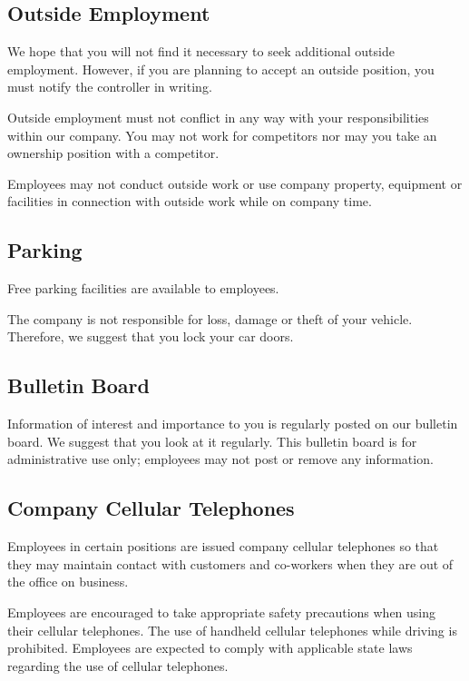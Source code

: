 \subsection{Outside Employment}

We hope that you will not find it necessary to seek additional outside employment. However, if you are planning to accept an outside position, you must notify the controller in writing.

Outside employment must not conflict in any way with your responsibilities within our company. You may not work for competitors nor may you take an ownership position with a competitor.

Employees may not conduct outside work or use company property, equipment or facilities in connection with outside work while on company time.

\subsection{Parking}

Free parking facilities are available to employees.

The company is not responsible for loss, damage or theft of your vehicle. Therefore, we suggest that you lock your car doors.

\subsection{Bulletin Board}

Information of interest and importance to you is regularly posted on our bulletin board. We suggest that you look at it regularly. This bulletin board is for administrative use only; employees may not post or remove any information.

\subsection{Company Cellular Telephones}

Employees in certain positions are issued company cellular telephones so that they may maintain contact with customers and co-workers when they are out of the office on business.

Employees are encouraged to take appropriate safety precautions when using their cellular telephones. The use of handheld cellular telephones while driving is prohibited. Employees are expected to comply with applicable state laws regarding the use of cellular telephones.

